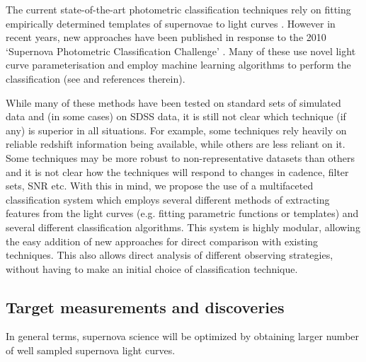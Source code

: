 The current state-of-the-art photometric classification techniques rely on fitting empirically 
determined templates of supernovae to light curves \citep{Jha2007,Guy2007,Sako2011}. However in 
recent years, new approaches have been published in response to the 2010 `Supernova 
Photometric Classification Challenge' \citep{Kessler2010a}. Many of these use novel light curve 
parameterisation and employ machine learning algorithms to perform the classification (see 
\citet{Kessler2010b} and references therein).

While many of these methods have been tested on standard sets of simulated data and (in some cases) 
on SDSS data, it is still not clear which technique (if any) is superior in all situations. For 
example, some techniques rely heavily on reliable redshift information being available, while others 
are less reliant on it. Some techniques may be more robust to non-representative datasets than 
others and it is not clear how the techniques will respond to changes in cadence, filter sets, SNR 
etc. With this in mind, we propose the use of a multifaceted classification system which employs 
several different methods of extracting features from the light curves (e.g. fitting parametric 
functions or templates) and several different classification algorithms. This system is highly 
modular, allowing the easy addition of new approaches for direct comparison with existing 
techniques. This also allows direct analysis of different observing strategies, without having to 
make an initial choice of classification technique. 


\subsection{Target measurements and discoveries}
\label{sec:keyword:targets}




In general terms, supernova science will be optimized by obtaining larger number of well sampled 
supernova light curves.



